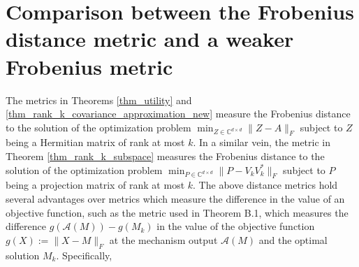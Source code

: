 \documentclass[11pt,letterpaper]{article}
\begin{document}
\section{Comparison between the Frobenius distance metric and a weaker Frobenius metric}\label{sec_strong_weak_metric_comparison}


 The metrics in Theorems \ref{thm_utility} and \ref{thm_rank_k_covariance_approximation_new} measure the Frobenius distance to the solution of the optimization problem $\min_{Z \in \mathbb{C}^{d \times d}} \|  Z - A\|_F$ subject to $Z$ being a Hermitian matrix of rank at most $k$.
 In a similar vein, the metric in Theorem \ref{thm_rank_k_subspace} measures the Frobenius distance to the solution of the optimization problem $\min_{P \in \mathbb{C}^{d\times d}} \|  P - V_k V_k^\ast\|_F$ subject to $P$ being a projection matrix of rank at most $k$.
 The above distance metrics hold several advantages over metrics which measure the difference in the value of an objective function, such as the metric used in Theorem B.1, which measures the difference $g(\mathcal{A}(M)) - g(M_k)$ in the value of the objective function $g(X) := \|X - M\|_F$ at the mechanism output $\mathcal{A}(M)$ and the optimal solution $M_k$.
 Specifically,
 
\end{document}
